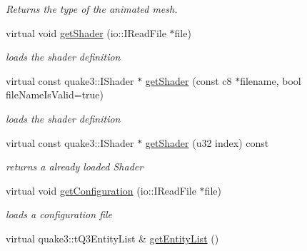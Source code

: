 \begin{DoxyCompactItemize}
\begin{DoxyCompactList}\small\item\em Returns the type of the animated mesh. \end{DoxyCompactList}\item 
\hypertarget{classirr_1_1scene_1_1_c_q3_level_mesh_ae471fe9c4058a67948f79590f7527a1f}{virtual void \hyperlink{classirr_1_1scene_1_1_c_q3_level_mesh_ae471fe9c4058a67948f79590f7527a1f}{get\-Shader} (io\-::\-I\-Read\-File $\ast$file)}\label{classirr_1_1scene_1_1_c_q3_level_mesh_ae471fe9c4058a67948f79590f7527a1f}

\begin{DoxyCompactList}\small\item\em loads the shader definition \end{DoxyCompactList}\item 
\hypertarget{classirr_1_1scene_1_1_c_q3_level_mesh_a7fe1de2c85690e8680462de2b2932411}{virtual const quake3\-::\-I\-Shader $\ast$ \hyperlink{classirr_1_1scene_1_1_c_q3_level_mesh_a7fe1de2c85690e8680462de2b2932411}{get\-Shader} (const c8 $\ast$filename, bool file\-Name\-Is\-Valid=true)}\label{classirr_1_1scene_1_1_c_q3_level_mesh_a7fe1de2c85690e8680462de2b2932411}

\begin{DoxyCompactList}\small\item\em loads the shader definition \end{DoxyCompactList}\item 
\hypertarget{classirr_1_1scene_1_1_c_q3_level_mesh_a5de1a6c7d31f1e71666b0a28e2e2a878}{virtual const quake3\-::\-I\-Shader $\ast$ \hyperlink{classirr_1_1scene_1_1_c_q3_level_mesh_a5de1a6c7d31f1e71666b0a28e2e2a878}{get\-Shader} (u32 index) const }\label{classirr_1_1scene_1_1_c_q3_level_mesh_a5de1a6c7d31f1e71666b0a28e2e2a878}

\begin{DoxyCompactList}\small\item\em returns a already loaded Shader \end{DoxyCompactList}\item 
\hypertarget{classirr_1_1scene_1_1_c_q3_level_mesh_ad0c966a58138d99062904be55bf6a925}{virtual void \hyperlink{classirr_1_1scene_1_1_c_q3_level_mesh_ad0c966a58138d99062904be55bf6a925}{get\-Configuration} (io\-::\-I\-Read\-File $\ast$file)}\label{classirr_1_1scene_1_1_c_q3_level_mesh_ad0c966a58138d99062904be55bf6a925}

\begin{DoxyCompactList}\small\item\em loads a configuration file \end{DoxyCompactList}\item 
\hypertarget{classirr_1_1scene_1_1_c_q3_level_mesh_a7df18131963ec7468487c68a808b02fc}{virtual quake3\-::t\-Q3\-Entity\-List \& \hyperlink{classirr_1_1scene_1_1_c_q3_level_mesh_a7df18131963ec7468487c68a808b02fc}{get\-Entity\-List} ()}\label{classirr_1_1scene_1_1_c_q3_level_mesh_a7df18131963ec7468487c68a808b02fc}


\end{DoxyCompactItemize}
